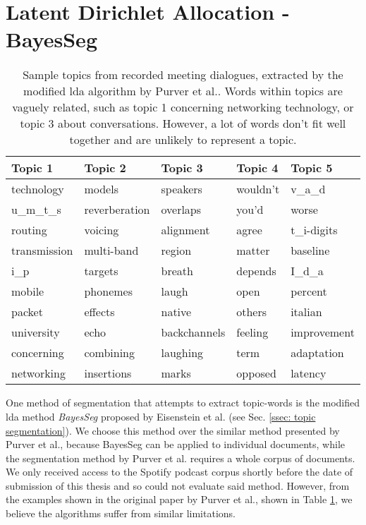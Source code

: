 \section[LDA BayesSeg]{Latent Dirichlet Allocation - BayesSeg \label{method: LDA}}
    \begin{table}[]
    \centering
    \begin{tabular}{lllll}
    \hline
    \textbf{Topic 1}   & \textbf{Topic 2}    & \textbf{Topic 3}   & \textbf{Topic 4} & \textbf{Topic 5}  \\ \hline
    technology   & models        & speakers     & wouldn't   & v\_a\_d     \\
    u\_m\_t\_s   & reverberation & overlaps     & you'd      & worse       \\
    routing      & voicing       & alignment    & agree      & t\_i-digits \\
    transmission & multi-band    & region       & matter     & baseline    \\
    i\_p         & targets       & breath       & depends    & I\_d\_a     \\
    mobile       & phonemes      & laugh        & open       & percent     \\
    packet       & effects       & native       & others     & italian     \\
    university   & echo          & backchannels & feeling    & improvement \\
    concerning   & combining     & laughing     & term       & adaptation  \\
    networking   & insertions    & marks        & opposed    & latency     \\ \hline
    \end{tabular}
    \caption{Sample topics from recorded meeting dialogues, extracted by the modified \gls{lda} algorithm by Purver et al.\cite{purver2006unsupervised}. Words within topics are vaguely related, such as topic 1 concerning networking technology, or topic 3 about conversations. However, a lot of words don't fit well together and are unlikely to represent a topic.}
    \label{table: modified lda topics}
    \end{table}

    One method of segmentation that attempts to extract topic-words is the modified \gls{lda} method \textit{BayesSeg} proposed by Eisenstein et al.\cite{eisenstein2008bayesian} (see Sec. \ref{ssec: topic segmentation}). We choose this method over the similar method presented by Purver et al.\cite{purver2006unsupervised}, because BayesSeg can be applied to individual documents, while the segmentation method by Purver et al. requires a whole corpus of documents. We only received access to the Spotify podcast corpus shortly before the date of submission of this thesis and so could not evaluate said method. However, from the examples shown in the original paper by Purver et al.\cite{purver2006unsupervised}, shown in Table \ref{table: modified lda topics}, we believe the algorithms suffer from similar limitations.

